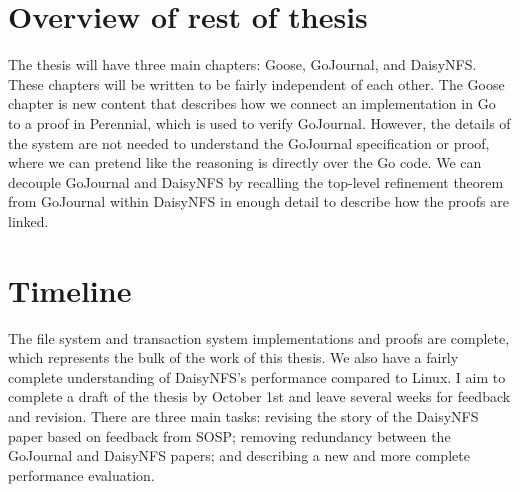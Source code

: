 \section{Overview of rest of thesis}
The thesis will have three main chapters: Goose, GoJournal, and DaisyNFS.\@
These chapters will be written to be fairly independent of each other. The Goose
chapter is new content that describes how we connect an implementation in Go to
a proof in Perennial, which is used to verify GoJournal. However, the details of
the system are not needed to understand the GoJournal specification or proof,
where we can pretend like the reasoning is directly over the Go code. We can
decouple GoJournal and DaisyNFS by recalling the top-level refinement theorem
from GoJournal within DaisyNFS in enough detail to describe how the proofs are
linked.

\section{Timeline}
The file system and transaction system implementations and proofs are complete,
which represents the bulk of the work of this thesis. We also have a fairly
complete understanding of DaisyNFS's performance compared to Linux. I aim to
complete a draft of the thesis by October 1st and leave several weeks for
feedback and revision. There are three main tasks: revising the story of the
DaisyNFS paper based on feedback from SOSP; removing redundancy between the
GoJournal and DaisyNFS papers; and describing a new and more complete
performance evaluation.
